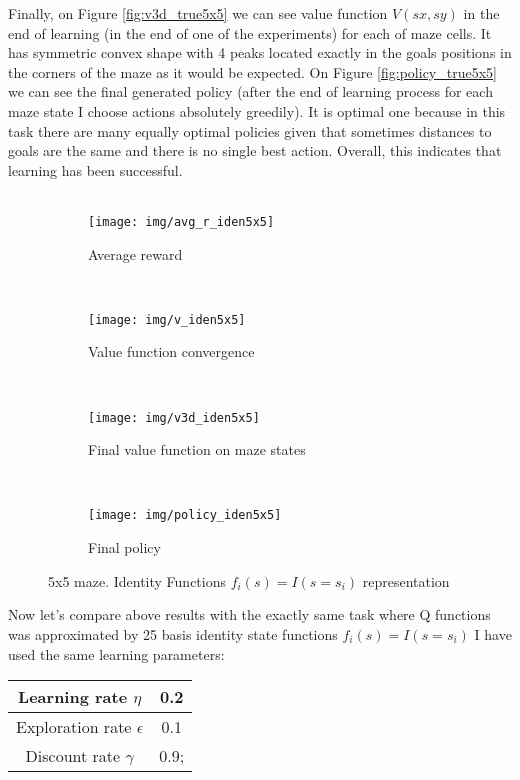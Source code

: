 \documentclass[a4paper,11pt]{article}
\theoremstyle{mytheor}
\begin{document}
Finally, on Figure \ref{fig:v3d_true5x5} we can see value function $V(sx, sy)$ in the end of learning (in the end of one of the experiments) for each of maze cells. It has symmetric convex shape with 4 peaks located exactly in the goals positions in the corners of the maze as it would be expected. On Figure \ref{fig:policy_true5x5} we can see the final generated policy (after the end of learning process for each maze state I choose actions absolutely greedily). It is optimal one because in this task there are many equally optimal policies given that sometimes distances to goals are the same and there is no single best action. Overall, this indicates that learning has been successful. 
\\\\
\begin{figure}[htbp!]
 \centering
 \begin{subfigure}[t]{0.49\textwidth}
 	\texttt{[image: img/avg\_r\_iden5x5]}
 	\caption{Average reward}
 	\label{fig:avg_r_iden5x5}
 \end{subfigure}
 ~
 \centering
 \begin{subfigure}[t]{0.49\textwidth}
 	\texttt{[image: img/v\_iden5x5]}
 	\caption{Value function convergence}
 	\label{fig:v_iden5x5}
 \end{subfigure}
 \\
 \centering
 \begin{subfigure}[t]{0.49\textwidth}
 	\texttt{[image: img/v3d\_iden5x5]}
 	\caption{Final value function on maze states}
 	\label{fig:v3d_iden5x5}
 \end{subfigure} 
 ~
 \centering
 \begin{subfigure}[t]{0.49\textwidth}
 	\texttt{[image: img/policy\_iden5x5]}
 	\caption{Final policy}
 	\label{fig:policy_iden5x5}
 \end{subfigure} 	
 \caption{5x5 maze. Identity Functions $f_{i}(s)=I(s=s_i)$ representation}
\end{figure}

Now let's compare above results with the exactly same task where Q functions was approximated by 25 basis identity state functions $f_{i}(s)=I(s=s_i)$
I have used the same learning parameters:
\begin{center}
	\begin{tabular}{| c | c | }
		\hline
		Learning rate $\eta$ &  0.2 \\ 
		\hline
		Exploration rate $\epsilon$ & 0.1 \\ 
		\hline
		Discount rate $\gamma$ & 0.9; \\
		\hline
	\end{tabular}
\end{center}
\end{document}
